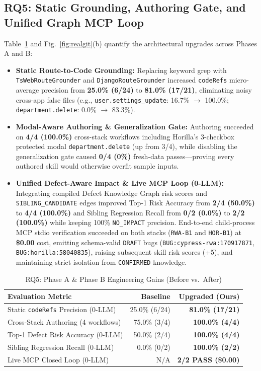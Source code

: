 \documentclass[conference]{IEEEtran}
\begin{document}
\subsection{RQ5: Static Grounding, Authoring Gate, and Unified Graph MCP Loop}
Table~\ref{tab:phase-ab} and Fig.~\ref{fig:realgit}(b) quantify the architectural upgrades across Phases A and B:
\begin{itemize}
  \item \textbf{Static Route-to-Code Grounding:} Replacing keyword grep with \texttt{TsWebRouteGrounder} and \texttt{DjangoRouteGrounder} increased \texttt{codeRefs} micro-average precision from \textbf{25.0\% (6/24)} to \textbf{81.0\% (17/21)}, eliminating noisy cross-app false files (e.g., \texttt{user.settings\_update}: 16.7\% $\rightarrow$ 100.0\%; \texttt{department.delete}: 0.0\% $\rightarrow$ 83.3\%).
  \item \textbf{Modal-Aware Authoring \& Generalization Gate:} Authoring succeeded on \textbf{4/4 (100.0\%)} cross-stack workflows including Horilla's 3-checkbox protected modal \texttt{department.delete} (up from 3/4), while disabling the generalization gate caused \textbf{0/4 (0\%)} fresh-data passes---proving every authored skill would otherwise overfit sample inputs.
  \item \textbf{Unified Defect-Aware Impact \& Live MCP Loop (0-LLM):} Integrating compiled Defect Knowledge Graph risk scores and \texttt{SIBLING\_CANDIDATE} edges improved Top-1 Risk Accuracy from \textbf{2/4 (50.0\%)} to \textbf{4/4 (100.0\%)} and Sibling Regression Recall from \textbf{0/2 (0.0\%)} to \textbf{2/2 (100.0\%)} while keeping 100\% \texttt{NO\_IMPACT} precision. End-to-end child-process MCP stdio verification succeeded on both stacks (\texttt{RWA-B1} and \texttt{HOR-B1}) at \textbf{\$0.00} cost, emitting schema-valid \texttt{DRAFT} bugs (\texttt{BUG:cypress-rwa:170917871}, \texttt{BUG:horilla:58040835}), raising subsequent skill risk scores (+5), and maintaining strict isolation from \texttt{CONFIRMED} knowledge.
\end{itemize}

\begin{table}[t]
\centering
\caption{RQ5: Phase A \& Phase B Engineering Gains (Before vs.\ After)}
\label{tab:phase-ab}
\begin{tabular}{lrr}
\toprule
Evaluation Metric & Baseline & Upgraded (Ours) \\
\midrule
Static \texttt{codeRefs} Precision (0-LLM) & 25.0\% (6/24) & \textbf{81.0\% (17/21)} \\
Cross-Stack Authoring (4 workflows) & 75.0\% (3/4) & \textbf{100.0\% (4/4)} \\
Top-1 Defect Risk Accuracy (0-LLM) & 50.0\% (2/4) & \textbf{100.0\% (4/4)} \\
Sibling Regression Recall (0-LLM) & 0.0\% (0/2) & \textbf{100.0\% (2/2)} \\
Live MCP Closed Loop (0-LLM) & N/A & \textbf{2/2 PASS (\$0.00)} \\
\bottomrule
\end{tabular}
\end{table}
\end{document}
